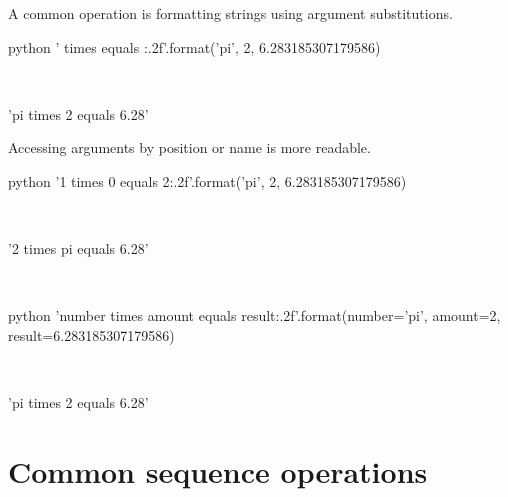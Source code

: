 \documentclass[aspectratio=1610,slidestop]{beamer}
\begin{document}
\begin{pframe}
 A common operation is formatting strings using argument substitutions.
 \begin{ipython}
  \begin{pythonin}{python}
'{} times {} equals {:.2f}'.format('pi', 2, 6.283185307179586)
  \end{pythonin}
  \\
  \begin{pythonout}
'pi times 2 equals 6.28'
  \end{pythonout}
 \end{ipython}

 Accessing arguments by position or name is more readable.
 \begin{ipython}
  \begin{pythonin}{python}
'{1} times {0} equals {2:.2f}'.format('pi', 2, 6.283185307179586)
  \end{pythonin}
  \\
  \begin{pythonout}
'2 times pi equals 6.28'
  \end{pythonout}
  \\

  \begin{pythonin}{python}
'{number} times {amount} equals {result:.2f}'.format(number='pi', amount=2, result=6.283185307179586)
  \end{pythonin}
  \\
  \begin{pythonout}
'pi times 2 equals 6.28'
  \end{pythonout}
 \end{ipython}
\end{pframe}


\section{Common sequence operations}
\end{document}
